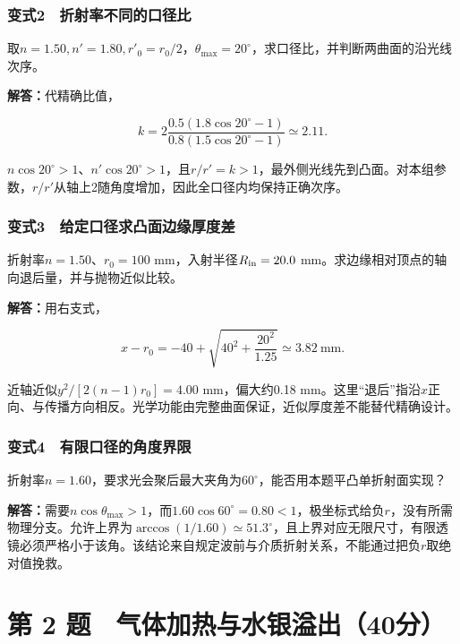 \documentclass[12pt,a4paper,fontset=fandol]{ctexart}
\begin{document}
\subsubsection{变式2　折射率不同的口径比}\label{ux53d8ux5f0f2-ux6298ux5c04ux7387ux4e0dux540cux7684ux53e3ux5f84ux6bd4}

取\(n=1.50,n'=1.80,r'_0=r_0/2\)，\(\theta_{\max}=20^\circ\)，求口径比，并判断两曲面的沿光线次序。

\textbf{解答：}代精确比值，

\[
k=2\frac{0.5(1.8\cos20^\circ-1)}
{0.8(1.5\cos20^\circ-1)}
\simeq2.11.
\]

\(n\cos20^\circ>1\)、\(n'\cos20^\circ>1\)，且\(r/r'=k>1\)，最外侧光线先到凸面。对本组参数，\(r/r'\)从轴上2随角度增加，因此全口径内均保持正确次序。

\subsubsection{变式3　给定口径求凸面边缘厚度差}\label{ux53d8ux5f0f3-ux7ed9ux5b9aux53e3ux5f84ux6c42ux51f8ux9762ux8fb9ux7f18ux539aux5ea6ux5dee}

折射率\(n=1.50\)、\(r_0=100\) mm，入射半径\(R_{\rm in}=20.0\)
mm。求边缘相对顶点的轴向退后量，并与抛物近似比较。

\textbf{解答：}用右支式，

\[
x-r_0=-40+\sqrt{40^2+\frac{20^2}{1.25}}
\simeq3.82\ \mathrm{mm}.
\]

近轴近似\(y^2/[2(n-1)r_0]=4.00\) mm，偏大约0.18
mm。这里``退后''指沿\(x\)正向、与传播方向相反。光学功能由完整曲面保证，近似厚度差不能替代精确设计。

\subsubsection{变式4　有限口径的角度界限}\label{ux53d8ux5f0f4-ux6709ux9650ux53e3ux5f84ux7684ux89d2ux5ea6ux754cux9650}

折射率\(n=1.60\)，要求光会聚后最大夹角为\(60^\circ\)，能否用本题平凸单折射面实现？

\textbf{解答：}需要\(n\cos\theta_{\max}>1\)，而\(1.60\cos60^\circ=0.80<1\)，极坐标式给负\(r\)，没有所需物理分支。允许上界为\(\arccos(1/1.60)\simeq51.3^\circ\)，且上界对应无限尺寸，有限透镜必须严格小于该角。该结论来自规定波前与介质折射关系，不能通过把负\(r\)取绝对值挽救。

\clearpage

\section{第 2
题　气体加热与水银溢出（40分）}\label{ux7b2c-2-ux9898-ux6c14ux4f53ux52a0ux70edux4e0eux6c34ux94f6ux6ea2ux51fa40ux5206}
\end{document}
